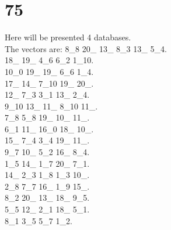\chapter{75}
\indent Here will be presented 4 databases.\\
The vectors are:
8\_8 20\_ 13\_ 8\_3 13\_ 5\_4.\\18\_ 19\_ 4\_6 6\_2 1\_10.\\10\_0 19\_ 19\_ 6\_6 1\_4.\\17\_ 14\_ 7\_10 19\_ 20\_.\\12\_ 7\_3 3\_1 13\_ 2\_4.\\9\_10 13\_ 11\_ 8\_10 11\_.\\7\_8 5\_8 19\_ 10\_ 11\_.\\6\_1 11\_ 16\_0 18\_ 10\_.\\15\_ 7\_4 3\_4 19\_ 11\_.\\9\_7 10\_ 5\_2 16\_ 8\_4.\\1\_5 14\_ 1\_7 20\_ 7\_1.\\14\_ 2\_3 1\_8 1\_3 10\_.\\2\_8 7\_7 16\_ 1\_9 15\_.\\8\_2 20\_ 13\_ 18\_ 9\_5.\\5\_5 12\_ 2\_1 18\_ 5\_1.\\8\_1 3\_5 5\_7 1\_2.\\